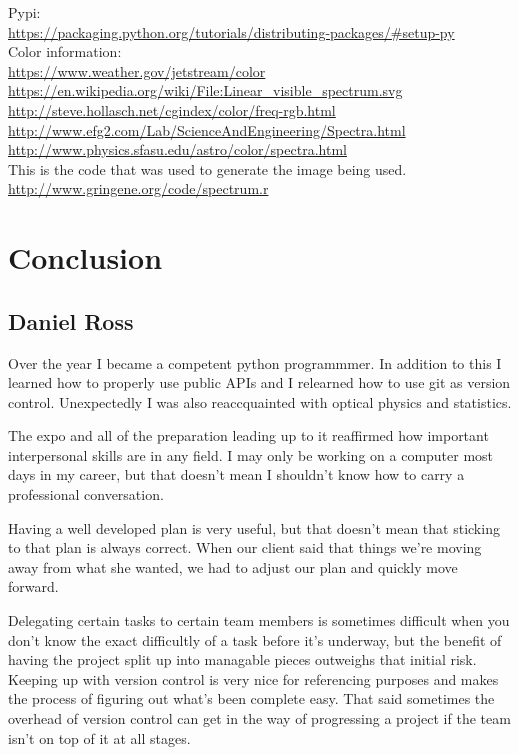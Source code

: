 \documentclass[onecolumn, draftclsnofoot,10pt, compsoc]{IEEEtran}
\begin{document}
\begin{singlespace}
		Pypi:\\
		\url{https://packaging.python.org/tutorials/distributing-packages/#setup-py} \\
		
		Color information: \\
		\url{https://www.weather.gov/jetstream/color} \\
		\url{https://en.wikipedia.org/wiki/File:Linear_visible_spectrum.svg} \\
		\url{http://steve.hollasch.net/cgindex/color/freq-rgb.html} \\
		\url{http://www.efg2.com/Lab/ScienceAndEngineering/Spectra.html} \\
		\url{http://www.physics.sfasu.edu/astro/color/spectra.html} \\

		This is the code that was used to generate the image being used. \\
		\url{http://www.gringene.org/code/spectrum.r} \\


	\section{Conclusion}
		\subsection{Daniel Ross}

			Over the year I became a competent python programmmer.
			In addition to this I learned how to properly use public APIs and I relearned how to use git as version control.
			Unexpectedly I was also reaccquainted with optical physics and statistics.

			The expo and all of the preparation leading up to it reaffirmed how important interpersonal skills are in any field.
			I may only be working on a computer most days in my career, but that doesn't mean I shouldn't know how to carry a professional conversation.

			Having a well developed plan is very useful, but that doesn't mean that sticking to that plan is always correct.
			When our client said that things we're moving away from what she wanted, we had to adjust our plan and quickly move forward.


			Delegating certain tasks to certain team members is sometimes difficult when you don't know the exact difficultly of a task before it's underway, but the benefit of having the project split up into managable pieces outweighs that initial risk.
			Keeping up with version control is very nice for referencing purposes and makes the process of figuring out what's been complete easy.
			That said sometimes the overhead of version control can get in the way of progressing a project if the team isn't on top of it at all stages.


\end{singlespace}
\end{document}
